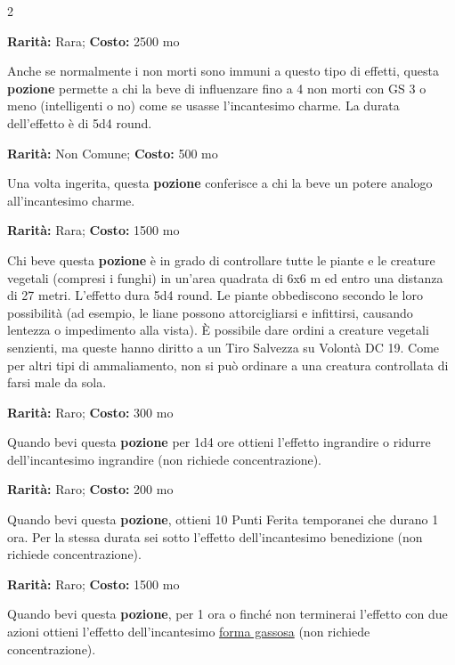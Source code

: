 \begin{multicols}{2}

\textbf{Rarità:} Rara; \textbf{Costo:} 2500 mo

Anche se normalmente i non morti sono immuni a questo tipo di effetti, questa \textbf{pozione} permette a chi la beve di influenzare fino a 4 non morti con GS 3 o meno (intelligenti o no) come se usasse l'incantesimo charme. La durata dell'effetto è di 5d4 round.


\textbf{Rarità:} Non Comune; \textbf{Costo:} 500 mo

Una volta ingerita, questa \textbf{pozione} conferisce a chi la beve un potere analogo all'incantesimo charme.


\textbf{Rarità:} Rara; \textbf{Costo:} 1500 mo

Chi beve questa \textbf{pozione} è in grado di controllare tutte le piante e le creature vegetali (compresi i funghi) in un'area quadrata di 6x6 m ed entro una distanza di 27 metri. L'effetto dura 5d4 round. Le piante obbediscono secondo le loro possibilità (ad esempio, le liane possono attorcigliarsi e infittirsi, causando lentezza o impedimento alla vista). È possibile dare ordini a creature vegetali senzienti, ma queste hanno diritto a un Tiro Salvezza su Volontà DC 19. Come per altri tipi di ammaliamento, non si può ordinare a una creatura controllata di farsi male da sola.


\textbf{Rarità:} Raro; \textbf{Costo:} 300 mo

Quando bevi questa \textbf{pozione} per 1d4 ore ottieni l'effetto ingrandire o ridurre dell'incantesimo ingrandire (non richiede concentrazione).


\textbf{Rarità:} Raro; \textbf{Costo:} 200 mo

Quando bevi questa \textbf{pozione}, ottieni 10 Punti Ferita temporanei che durano 1 ora. Per la stessa durata sei sotto l'effetto dell'incantesimo benedizione (non richiede concentrazione).


\textbf{Rarità:} Raro; \textbf{Costo:} 1500 mo

Quando bevi questa \textbf{pozione}, per 1 ora o finché non terminerai l'effetto con due azioni ottieni l'effetto dell'incantesimo \hyperlink{Forma Gassosa}{forma gassosa} (non richiede concentrazione).


\end{multicols}
